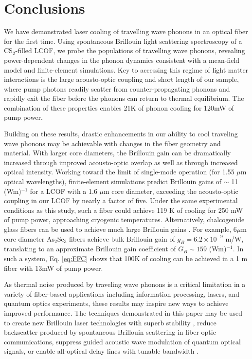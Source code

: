 \section{Conclusions}
We have demonstrated laser cooling of travelling wave phonons in an optical fiber for the first time.  Using spontaneous Brillouin light scattering spectroscopy of a CS$_2$-filled \ac{LCOF}, we probe the populations of travelling wave phonons, revealing power-dependent changes in the phonon dynamics consistent with a mean-field model and finite-element simulations. Key to accessing this regime of light matter interactions is the large acousto-optic coupling and short length of our sample, where pump photons readily scatter from counter-propagating phonons and rapidly exit the fiber before the phonons can return to thermal equilibrium. The combination of these properties enables 21K of phonon cooling for 120mW of pump power.

Building on these results, drastic enhancements in our ability to cool traveling wave phonons may be achievable with changes in the fiber geometry and material. With larger core diameters, the Brillouin gain can be dramatically increased through improved acousto-optic overlap as well as through increased optical intensity. Working toward the limit of single-mode operation (for 1.55 $\mu$m optical wavelengths), finite-element simulations predict Brillouin gains of $\sim$ 11 (Wm)$^{-1}$ for a \ac{LCOF} with a 1.6 $\mu$m core diameter, exceeding the acousto-optic coupling in our \ac{LCOF} by nearly a factor of five. Under the same experimental conditions as this study, such a fiber could achieve 119 K of cooling for 250 mW of pump power, approaching cryogenic temperatures. Alternatively, chalcogenide glass fibers can be used to achieve much large Brillouin gains \citep{abedin2005observation}. For example, $6 \mu$m core diameter As$_2$Se$_3$ fibers achieve bulk Brillouin gain of $g_B = 6.2 \times 10^{-9}$ m/W, translating to an approximate Brillouin gain coefficient of  $G_B \sim 159$ (Wm)$^{-1}$. In such a system, Eq. \eqref{eq:FFC} shows that 100K of cooling can be achieved in a 1 m fiber with 13mW of pump power.

As thermal noise produced by traveling wave phonons is a critical limitation in a variety of fiber-based applications including information processing, lasers, and quantum optics experiments, these results may inspire new ways to achieve improved performance.  The techniques demonstrated in this paper may be used to create new Brillouin laser technologies with superb stability \citep{behunin2018fundamental,li2012characterization}, reduce backscatter produced by spontaneous Brillouin scattering in fiber optic communications, suppress guided acoustic wave modulation of quantum optical signals, or enable all-optical delay lines with tunable bandwidth \citep{okawachi2005tunable}.

